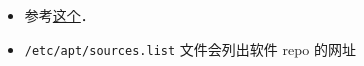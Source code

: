 
\begin{issues}
\issueDraft
\end{issues}


\begin{itemize}
\item 参考\href{https://itsfoss.com/ppa-guide/}{这个}．
\item \verb|/etc/apt/sources.list| 文件会列出软件 repo 的网址
\end{itemize}
